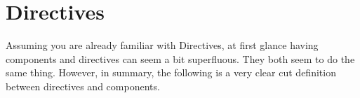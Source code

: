\section{ Directives }
\maketitle{}

Assuming you are already familiar with Directives, at first glance having
components and directives can seem a bit superfluous. They both seem to do the
same thing. However, in summary, the following is a very clear cut definition
between directives and components.
